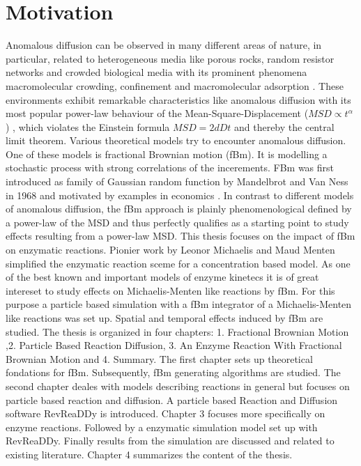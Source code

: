 \documentclass[
  a4paper,BCOR10mm,oneside,
  bibtotoc,idxtotoc,
  headsepline,footsepline,%
  fleqn,openbib
]{scrbook}
\begin{document}
\chapter*{Motivation}
Anomalous diffusion can be observed in many different areas of nature, in particular, related to heterogeneous media like porous rocks, random resistor networks and crowded biological media with its prominent phenomena macromolecular crowding, confinement and macromolecular adsorption \cite{Minton2006}. These environments exhibit remarkable characteristics like anomalous diffusion with its most popular power-law behaviour of the Mean-Square-Displacement ($MSD\propto t^{\alpha}$) \cite{Hofling2013}, which violates the Einstein formula $MSD=2 d D t$ and thereby the central limit theorem. Various theoretical models try to encounter anomalous diffusion. One of these models is fractional Brownian motion (fBm). It is modelling a stochastic process with strong correlations of the incerements. FBm was first introduced as family of Gaussian random function by Mandelbrot and Van Ness in 1968 and motivated by examples in economics \cite{Mandelbrot1968}. In contrast to different models of anomalous diffusion, the fBm approach is plainly phenomenological defined by a power-law of the MSD and thus perfectly qualifies as a starting point to study effects resulting from a power-law MSD. \newline This thesis focuses on the impact of fBm on enzymatic reactions. Pionier work by Leonor Michaelis and Maud Menten \cite{michaelis1913kinetik} simplified the enzymatic reaction sceme for a concentration based model. As one of the best known and important models of enzyme kinetecs it is of great intereset to study effects on Michaelis-Menten like reactions by fBm. For this purpose a particle based simulation with a fBm integrator of a Michaelis-Menten like reactions was set up. Spatial and temporal effects induced by fBm are studied. 
\newline The thesis is organized in four chapters: 1. Fractional Brownian Motion ,2. Particle Based Reaction Diffusion, 3. An Enzyme Reaction With Fractional Brownian Motion and 4. Summary. The first chapter sets up theoretical fondations for fBm. Subsequently, fBm generating algorithms are studied. The second chapter deales with models describing reactions in general but focuses on particle based reaction and diffusion. A particle based Reaction and Diffusion software RevReaDDy is introduced.  Chapter 3 focuses more specifically on enzyme reactions. Followed by a enzymatic simulation model set up with RevReaDDy. Finally results from the simulation are discussed and related to existing literature. Chapter 4 summarizes the content of the thesis. 
\end{document}

